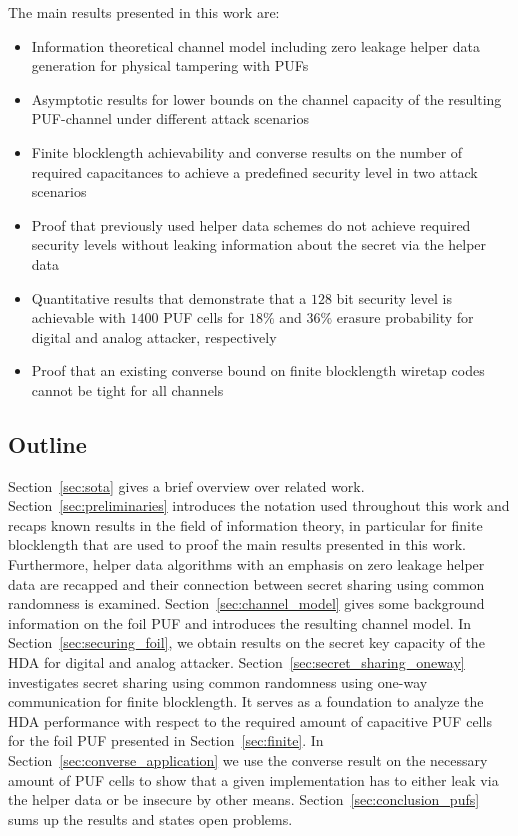 The main results presented in this work are:

\begin{itemize}
	\item Information theoretical channel model including zero leakage helper data generation for physical tampering with PUFs
	\item Asymptotic results for lower bounds on the channel capacity of the resulting PUF-channel under different attack scenarios
	\item Finite blocklength achievability and converse results on the number of required capacitances to achieve a predefined security level in two attack scenarios
	\item Proof that previously used helper data schemes do not achieve required security levels without leaking information about the secret via the helper data
	\item Quantitative results that demonstrate that a $128$ bit security level is achievable with $1400$ PUF cells for $18\%$ and $36\%$ erasure probability for digital and analog attacker, respectively
        \item Proof that an existing converse bound on finite blocklength wiretap codes cannot be tight for all channels
\end{itemize}

\subsection{Outline}

Section~\ref{sec:sota} gives a brief overview over related work. Section~\ref{sec:preliminaries} introduces the notation used throughout this work and recaps known results in the field of information theory, in particular for finite blocklength that are used to proof the main results presented in this work. Furthermore, helper data algorithms with an emphasis on zero leakage helper data are recapped and their connection between secret sharing using common randomness is examined. Section~\ref{sec:channel_model} gives some background information on the foil PUF and introduces the resulting channel model. In Section~\ref{sec:securing_foil}, we obtain results on the secret key capacity of the HDA for digital and analog attacker. Section~\ref{sec:secret_sharing_oneway} investigates secret sharing using common randomness using one-way communication for finite blocklength. It serves as a foundation to analyze the HDA performance with respect to the required amount of capacitive PUF cells for the foil PUF presented in Section~\ref{sec:finite}. In Section~\ref{sec:converse_application} we use the converse result on the necessary amount of PUF cells to show that a given implementation has to either leak via the helper data or be insecure by other means. Section~\ref{sec:conclusion_pufs} sums up the results and states open problems.
